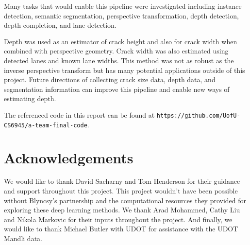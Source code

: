 \documentclass{article}
\begin{document}
Many tasks that would enable this pipeline were investigated including instance detection, semantic segmentation, perspective transformation, depth detection, depth completion, and lane detection.

Depth was used as an estimator of crack height and also for crack width when combined with perspective geometry.
Crack width was also estimated using detected lanes and known lane widths.
This method was not as robust as the inverse perspective transform but has many potential applications outside of this project.
Future directions of collecting crack size data, depth data, and segmentation information can improve this pipeline and enable new ways of estimating depth.

The referenced code in this report can be found at \nolinkurl{https://github.com/UofU-CS6945/a-team-final-code}.


\section{Acknowledgements}
We would like to thank David Sacharny and Tom Henderson for their guidance and support throughout this project. This project wouldn't have been possible without Blyncsy's partnership and the computational resources they provided for exploring these deep learning methods.
We thank Arad Mohammed, Cathy Liu and Nikola Markovic for their inputs throughout the project.
And finally, we would like to thank Michael Butler with UDOT for assistance with the UDOT Mandli data.

\pagebreak 

\printbibliography
\end{document}
